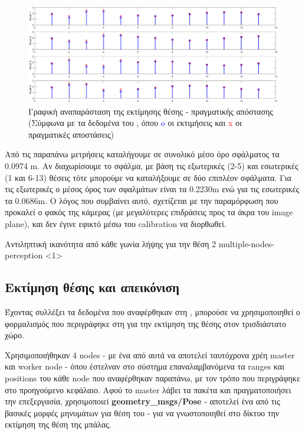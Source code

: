 \begin{figure}[H]
  \centering
  \includegraphics[width=0.9\linewidth]{../Images/Experiments-Results/nodes-estimations.png}
  \decoRule
  \caption[Γραφική αναπαράσταση της εκτίμησης θέσης - πραγματικής απόστασης]{Γραφική αναπαράσταση της εκτίμησης θέσης - πρα\-γμα\-τι\-κής απόστασης (Σύμφωνα με τα δεδομένα του , όπου \textcolor{blue}{o} οι εκτιμήσεις και \textcolor{red}{x} οι πραγματικές αποστάσεις)}
  \label{fig:est-act-dist-figure}
\end{figure}

Από τις παραπάνω μετρήσεις καταλήγουμε σε συνολικό μέσο όρο σφάλματος τα 0.0974 m. Αν διαχωρίσουμε το σφάλμα, με βάση τις εξωτερικές (2-5) και εσωτερικές (1 και 6-13) θέσεις τότε μπορούμε να καταλήξουμε σε δύο επιπλέον σφάλματα. Για τις εξωτερικές ο μέσος όρος των σφαλμάτων είναι τα 0.2230m ενώ για τις εσωτερικές τα 0.0686m. Ο λόγος που συμβαίνει αυτό, σχετίζεται με την παραμόρφωση που προκαλεί ο φακός της κάμερας (με μεγαλύτερες επιδράσεις προς τα άκρα του image plane), και δεν έγινε εφικτό μέσω του calibration να διορθωθεί.

{Αντιληπτική ικανότητα από κάθε γωνία λήψης για την θέση 2}%
{multiple-nodes-perception}%
<1>


\subsection{Εκτίμηση θέσης και απεικόνιση}
Έχοντας συλλέξει τα δεδομένα που αναφέρθηκαν στη , μπορούσε να χρησιμοποιηθεί ο φορμαλισμός που περιγράφηκε στη  για την εκτίμηση της θέσης στον τρισδιάστατο χώρο. 

Χρησιμοποιήθηκαν 4 nodes - με ένα από αυτά να αποτελεί ταυτόχρονα χρέη master και worker node - όπου έστελναν στο σύστημα επαναλαμβανόμενα τα ranges και positions του κάθε node που αναφέρθηκαν παραπάνω, με τον τρόπο που περιγράφηκε στο προηγούμενο κεφάλαιο. Αφού το master λάβει τα πακέτα και πραγματοποιήσει την επεξεργασία, χρησιμοποιεί \textbf{geometry\_msgs/Pose} - αποτελεί ένα από τις βασικές μορφές μηνυμάτων για θέση του  - για να γνωστοποιηθεί στο δίκτυο την εκτίμηση της θέση της μπάλας.

